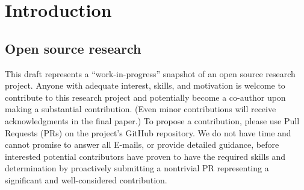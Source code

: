 \section{Introduction}
\label{sec:intro}









\subsection{Open source research}

This draft represents a ``work-in-progress'' snapshot
of an open source research project.
Anyone with adequate interest, skills, and motivation
is welcome to contribute to this research project
and potentially become a co-author upon making a substantial contribution.
(Even minor contributions will receive acknowledgments in the final paper.)
To propose a contribution, please use Pull Requests (PRs)
on the project's GitHub repository.
We do not have time and cannot promise to answer all E-mails,
or provide detailed guidance,
before interested potential contributors have proven to have
the required skills and determination by proactively submitting
a nontrivial PR representing a significant and well-considered contribution.

